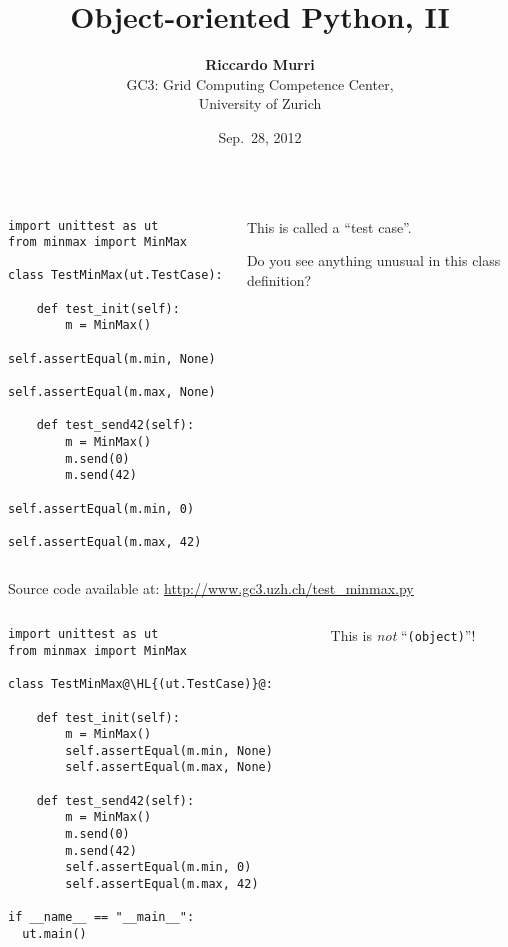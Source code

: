 \documentclass[english,serif,mathserif,xcolor=pdftex,dvipsnames,table]{beamer}
\title[OOP2]{%
  Object-oriented Python, II
}
\author[R. Murri]{%
  \textbf{Riccardo Murri} \\
  GC3: Grid Computing Competence Center, \\
  University of Zurich
}
\date{Sep.~28, 2012}
\begin{document}
\maketitle


\begin{frame}[fragile]
  \begin{columns}[t]
    \begin{column}{0.5\textwidth}
\begin{lstlisting}
import unittest as ut
from minmax import MinMax

class TestMinMax(ut.TestCase):

    def test_init(self):
        m = MinMax()
        self.assertEqual(m.min, None)
        self.assertEqual(m.max, None)

    def test_send42(self):
        m = MinMax()
        m.send(0)
        m.send(42)
        self.assertEqual(m.min, 0)
        self.assertEqual(m.max, 42)
\end{lstlisting}
    \end{column}
    \begin{column}{0.5\textwidth}
      \raggedleft 
      This is called a ``test case''.

      \+ 
      Do you see anything unusual in this class definition?
    \end{column}
  \end{columns}
  
  {\small Source code available at:
    \url{http://www.gc3.uzh.ch/test_minmax.py}}
\end{frame}


\begin{frame}[fragile]
  \begin{columns}[t]
    \begin{column}{0.5\textwidth}
\begin{lstlisting}
import unittest as ut
from minmax import MinMax

class TestMinMax@\HL{(ut.TestCase)}@:

    def test_init(self):
        m = MinMax()
        self.assertEqual(m.min, None)
        self.assertEqual(m.max, None)

    def test_send42(self):
        m = MinMax()
        m.send(0)
        m.send(42)
        self.assertEqual(m.min, 0)
        self.assertEqual(m.max, 42)

if __name__ == "__main__":
  ut.main()
\end{lstlisting}
    \end{column}
    \begin{column}{0.5\textwidth}
      \raggedleft 
      This is \emph{not} ``\texttt{(object)}''!
    \end{column}
  \end{columns}
\end{frame}
\end{document}
